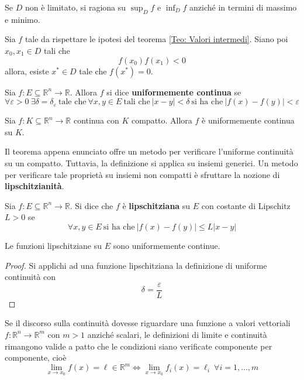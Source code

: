     \begin{oss}
        Se $D$ non è limitato, si ragiona su $\sup_{D}{f}$ e $\inf_{D}{f}$ anziché in termini di massimo e minimo.
    \end{oss}
\begin{corollary} \label{Teo: Teorema degli zeri}
    Sia $f$ tale da rispettare le ipotesi del teorema \ref{Teo: Valori intermedi}. Siano poi $x_0, x_1 \in D$ tali che 
    \begin{equation}
        f(x_0)f(x_1) < 0
    \end{equation}
    allora, esiste $x^* \in D$ tale che $f(x^*)=0$.
\end{corollary}
\begin{definition} \label{Def: Uniforme continuità}
    Sia $f:E \subseteq \mathbb{R}^n \to \mathbb{R}$. Allora $f$ si dice \textbf{uniformemente continua} se
    \begin{equation}
        \forall \varepsilon >0 \ \exists \delta=\delta_\varepsilon\ \text{tale che}\ \forall x, y \in E\ \text{tali che}\ |x-y|<\delta\ \text{si ha che}\ |f(x)-f(y)| < \varepsilon
    \end{equation}
\end{definition}
\begin{theorem} \label{Teo: Heine Cantor}
    Sia $f: K \subseteq \mathbb{R}^n \to \mathbb{R}$ continua con $K$ compatto. Allora $f$ è uniformemente continua su $K$.
\end{theorem}
Il teorema appena enunciato offre un metodo per verificare l'uniforme continuità su un compatto. Tuttavia, la definizione si applica su insiemi generici. Un metodo per verificare tale proprietà su insiemi non compatti è sfruttare la nozione di \textbf{lipschitzianità}.
\begin{definition}
    Sia $f:E \subseteq \mathbb{R}^n \to \mathbb{R}$. Si dice che $f$ è \textbf{lipschitziana} su $E$ con costante di Lipschitz $L>0$ se
    \begin{equation}
        \forall x,y \in E\ \text{si ha che}\ |f(x)-f(y)| \leq L|x-y|
    \end{equation}
\end{definition}
\begin{proposition}
    Le funzioni lipschitziane su $E$ sono uniformemente continue.
\end{proposition}
    \begin{proof}
        Si applichi ad una funzione lipschitziana la definizione di uniforme continuità con 
        \begin{equation}
            \delta= \frac{\varepsilon}{L}
        \end{equation}
    \end{proof}
Se il discorso sulla continuità dovesse riguardare una funzione a valori vettoriali $f: \mathbb{R}^n \to \mathbb{R}^m$ con $m>1$ anziché scalari, le definizioni di limite e continuità rimangono valide a patto che le condizioni siano verificate componente per componente, cioè
\begin{equation}
    \lim_{x \to x_0}{f(x)}=\ell \in \mathbb{R}^m \iff \lim_{x \to x_0}{f_i(x)}=\ell_i\ \forall i=1, \dots, m
\end{equation}
